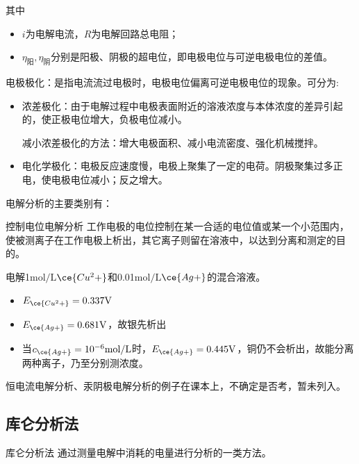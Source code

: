 其中
\begin{itemize}
	\item $i$为电解电流，$R$为电解回路总电阻；
	\item $\eta_{\text{阳}},\eta_{\text{阴}}$分别是阳极、阴极的超电位，即电极电位与可逆电极电位的差值。
\end{itemize}

\begin{note}
	电极极化：是指电流流过电极时，电极电位偏离可逆电极电位的现象。可分为:
	\begin{itemize}
		\item 浓差极化：由于电解过程中电极表面附近的溶液浓度与本体浓度的差异引起的，使正极电位增大，负极电位减小。
		
		减小浓差极化的方法：增大电极面积、减小电流密度、强化机械搅拌。
		\item 电化学极化：电极反应速度慢，电极上聚集了一定的电荷。阴极聚集过多正电，使电极电位减小；反之增大。
	\end{itemize}
\end{note}


电解分析的主要类别有：
\begin{definition*}{控制电位电解分析}{}
	工作电极的电位控制在某一合适的电位值或某一个小范围内，使被测离子在工作电极上析出，其它离子则留在溶液中，以达到{\heiti 分离和测定}的目的。
\end{definition*}

\begin{example}
	电解1$\mathrm{mol/L}$$\ce{Cu^2+}$和0.01$\mathrm{mol/L}$$\ce{Ag+}$的混合溶液。
	
	\begin{itemize}
		\item $E_{\ce{Cu^2+}}=0.337\mathrm{V}$
		\item $E_{\ce{Ag+}}=0.681\mathrm{V}$，故银先析出
		\item 当$c_{\ce{Ag+}}=10^{-6}\mathrm{mol/L}$时，$E_{\ce{Ag+}}=0.445\mathrm{V}$，铜仍不会析出，故能分离两种离子，乃至分别测浓度。
	\end{itemize}
\end{example}

恒电流电解分析、汞阴极电解分析的例子在课本上，不确定是否考，暂未列入。

\subsection{库仑分析法}
\begin{definition*}{库仑分析法}{}
	通过测量电解中消耗的电量进行分析的一类方法。
\end{definition*}
	
